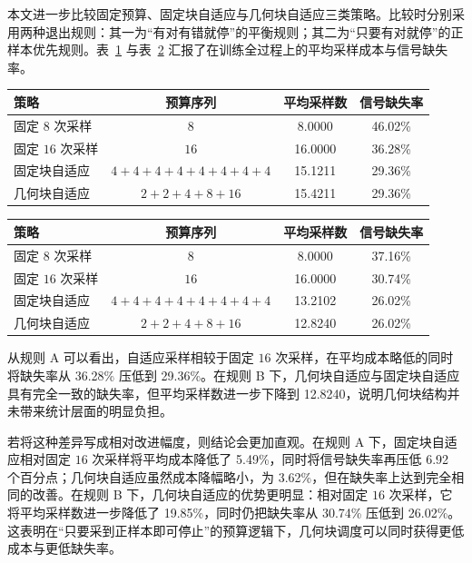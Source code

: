 本文进一步比较固定预算、固定块自适应与几何块自适应三类策略。比较时分别采用两种退出规则：其一为“有对有错就停”的平衡规则；其二为“只要有对就停”的正样本优先规则。表~\ref{tab:ruleA} 与表~\ref{tab:ruleB} 汇报了在训练全过程上的平均采样成本与信号缺失率。

\begin{table}[!htbp]
    \label{tab:ruleA}
    \centering
    \small
    \begin{tabular}{lccc}
        \hline
        策略 & 预算序列 & 平均采样数 & 信号缺失率 \\
        \hline
        固定 $8$ 次采样 & $8$ & 8.0000 & 46.02\% \\
        固定 $16$ 次采样 & $16$ & 16.0000 & 36.28\% \\
        固定块自适应 & $4{+}4{+}4{+}4{+}4{+}4{+}4{+}4$ & 15.1211 & 29.36\% \\
        几何块自适应 & $2{+}2{+}4{+}8{+}16$ & 15.4211 & 29.36\% \\
        \hline
    \end{tabular}
\end{table}

\begin{table}[!htbp]
    \label{tab:ruleB}
    \centering
    \small
    \begin{tabular}{lccc}
        \hline
        策略 & 预算序列 & 平均采样数 & 信号缺失率 \\
        \hline
        固定 $8$ 次采样 & $8$ & 8.0000 & 37.16\% \\
        固定 $16$ 次采样 & $16$ & 16.0000 & 30.74\% \\
        固定块自适应 & $4{+}4{+}4{+}4{+}4{+}4{+}4{+}4$ & 13.2102 & 26.02\% \\
        几何块自适应 & $2{+}2{+}4{+}8{+}16$ & 12.8240 & 26.02\% \\
        \hline
    \end{tabular}
\end{table}

从规则 A 可以看出，自适应采样相较于固定 $16$ 次采样，在平均成本略低的同时将缺失率从 36.28\% 压低到 29.36\%。在规则 B 下，几何块自适应与固定块自适应具有完全一致的缺失率，但平均采样数进一步下降到 12.8240，说明几何块结构并未带来统计层面的明显负担。

若将这种差异写成相对改进幅度，则结论会更加直观。在规则 A 下，固定块自适应相对固定 $16$ 次采样将平均成本降低了 5.49\%，同时将信号缺失率再压低 6.92 个百分点；几何块自适应虽然成本降幅略小，为 3.62\%，但在缺失率上达到完全相同的改善。在规则 B 下，几何块自适应的优势更明显：相对固定 $16$ 次采样，它将平均采样数进一步降低了 19.85\%，同时仍把缺失率从 30.74\% 压低到 26.02\%。这表明在“只要采到正样本即可停止”的预算逻辑下，几何块调度可以同时获得更低成本与更低缺失率。

